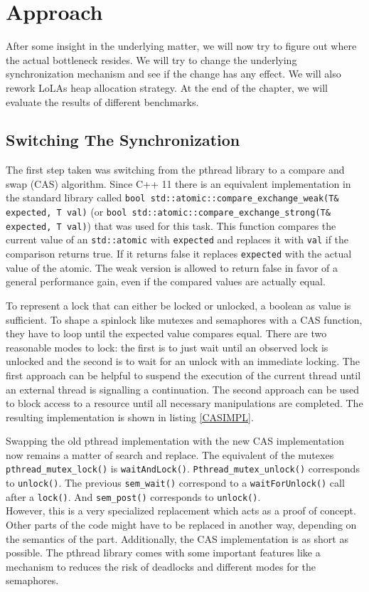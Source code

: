 

\chapter{Approach}
After some insight in the underlying matter, we will now try to figure out where the actual bottleneck resides. We will try to change the underlying synchronization mechanism and see if the change has any effect. We will also rework LoLAs heap allocation strategy. At the end of the chapter, we will evaluate the results of different benchmarks.

\section{Switching The Synchronization}
The first step taken was switching from the pthread library to a compare and swap (CAS) algorithm. Since C++ 11 there is an equivalent implementation in the standard library called \texttt{bool std::atomic::compare\_exchange\_weak(T\& expected, T val)} (or \texttt{bool std::atomic::compare\_exchange\_strong(T\& expected, T val)}) that was used for this task. This function compares the current value of an \texttt{std::atomic} with \texttt{expected} and replaces it with \texttt{val} if the comparison returns true. If it returns false it replaces \texttt{expected} with the actual value of the atomic. The weak version is allowed to return false in favor of a general performance gain, even if the compared values are actually equal.

To represent a lock that can either be locked or unlocked, a boolean as value is sufficient. To shape a spinlock like mutexes and semaphores with a CAS function, they have to loop until the expected value compares equal. There are two reasonable modes to lock: the first is to just wait until an observed lock is unlocked and the second is to wait for an unlock with an immediate locking. The first approach can be helpful to suspend the execution of the current thread until an external thread is signalling a continuation. The second approach can be used to block access to a resource until all necessary manipulations are completed. The resulting implementation is shown in listing \ref{CASIMPL}.

Swapping the old pthread implementation with the new CAS implementation now remains a matter of search and replace. The equivalent of the mutexes \texttt{pthread\_mutex\_lock()} is \texttt{waitAndLock()}. \texttt{Pthread\_mutex\_unlock()} corresponds to \texttt{unlock()}. The previous \texttt{sem\_wait()} correspond to a \texttt{waitForUnlock()} call after a \texttt{lock()}. And \texttt{sem\_post()} corresponds to \texttt{unlock()}.\\
However, this is a very specialized replacement which acts as a proof of concept. Other parts of the code might have to be replaced in another way, depending on the semantics of the part. Additionally, the CAS implementation is as short as possible. The pthread library comes with some important features like a mechanism to reduces the risk of deadlocks and different modes for the semaphores.

